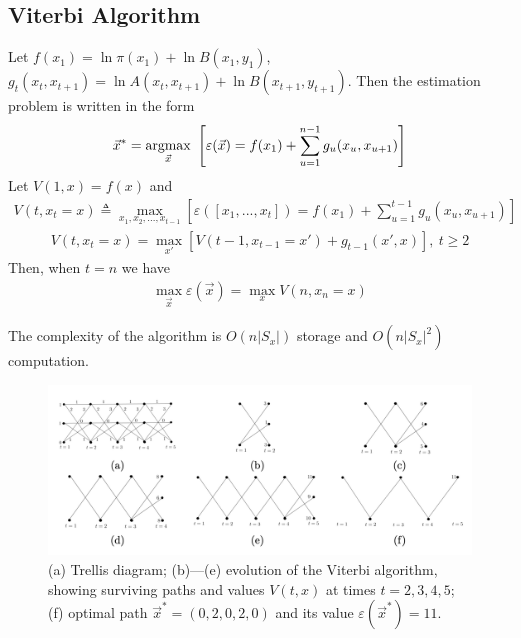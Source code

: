 \documentclass[11pt]{elegantbook}
\newcommand{\argmax}{\operatornamewithlimits{argmax}}
\begin{document}
\subsection{Viterbi Algorithm}
Let $f(x_1)=\ln\pi(x_1)+\ln B(x_1,y_1)$, $g_t(x_t,x_{t+1})=\ln A(x_t,x_{t+1})+\ln B(x_{t+1},y_{t+1})$. Then the estimation problem is written in the form
\begin{equation}
    \begin{aligned}
        \vec{x}^*=\argmax_{\vec{x}}\ \left[\varepsilon (\vec{x})=f(x_1)+\sum_{u=1}^{n-1}g_u(x_u,x_{u+1})\right]
    \end{aligned}
    \nonumber
\end{equation}
Let $V(1,x)=f(x)$ and
\begin{equation}
    \begin{aligned}
        V(t,x_t=x)\triangleq \max_{x_1,x_2,...,x_{t-1}}\left[\varepsilon([x_1,...,x_t])=f(x_1)+\sum_{u=1}^{t-1}g_u(x_u,x_{u+1})\right]
    \end{aligned}
    \nonumber
\end{equation}
\begin{equation}
    \begin{aligned}
        V(t,x_t=x)=\max_{x'} \left[V(t-1,x_{t-1}=x')+g_{t-1}(x',x)\right],\ t\geq 2
    \end{aligned}
    \nonumber
\end{equation}
Then, when $t=n$ we have
\begin{equation}
    \begin{aligned}
        \max_{\vec{x}}\varepsilon(\vec{x})=\max_{x} V(n,x_n=x)
    \end{aligned}
    \nonumber
\end{equation}

The complexity of the algorithm is $O(n|S_x|)$ storage and $O(n|S_x|^2)$ computation.

\begin{center}\begin{figure}[htbp]
    \centering
    \includegraphics[scale=0.2]{dia.png}
    \caption{(a) Trellis diagram; (b)—(e) evolution of the Viterbi algorithm, showing surviving paths and values $V(t,x)$ at times $t = 2,3,4,5$; (f) optimal path $\vec{x}^* = (0,2,0,2,0)$ and its value $\varepsilon(\vec{x}^*) = 11$.}
    \label{}
\end{figure}\end{center}
\end{document}
